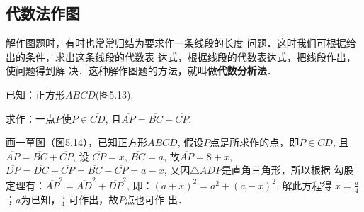 \subsection{代数法作图}
解作图题时，有时也常常归结为要求作一条线段的长度
问题．这时我们可根据给出的条件，求出这条线段的代数表
达式，根据线段的代数表达式，把线段作出，使问题得到解
决．这种解作图题的方法，就叫做\textbf{代数分析法}．

\begin{example}
    已知：正方形$ABCD$(图5.13).

    求作：一点$P$使$P\in \overline{CD}$, 且$\overline{AP}=\overline{BC}+\overline{CP}$.
\end{example}

\begin{figure}[htp]\centering
    \begin{minipage}[t]{0.48\textwidth}
    \centering
{}
    \caption{}
    \end{minipage}
    \begin{minipage}[t]{0.48\textwidth}
    \centering
    \caption{}
    \end{minipage}
    \end{figure}

\begin{analyze}
    画一草图（图5.14），已知正方形$ABCD$, 假设$P$点是所求作的点，即$P\in \overline{CD}$, 且$\overline{AP}=\overline{BC}+
    \overline{CP}$, 设
    $\overline{CP}=x$, $\overline{BC}=a$, 故$\overline{AP}=8+x$, $\overline{DP}=\overline{DC}-\overline{CP}=\overline{BC}-\overline{CP}=a-x$, 又因$\triangle ADP$是直角三角形，所以根据
    勾股定理有：$\overline{AP}^2=\overline{AD}^2+\overline{DP}^2$, 即：$(a+x)^2=a^2+(a-x)^2$.
    解此方程得
    $x=\frac{a}{4}$；$a$为已知，$\frac{a}{4}$
    可作出，故$P$点也可作
    出．
\end{analyze}

